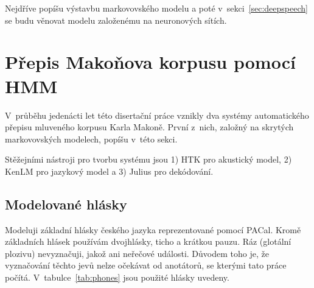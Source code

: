Nejdříve popíšu výstavbu markovovského modelu a poté
v~sekci~\ref{sec:deepspeech} se budu věnovat modelu založenému na neuronových
sítích.

\section{Přepis Makoňova korpusu pomocí HMM}

V~průběhu jedenácti let této disertační práce vznikly dva systémy automatického
přepisu mluveného korpusu Karla Makoně. První z~nich, založný na skrytých
markovovských modelech, popíšu v~této sekci.

Stěžejními nástroji pro tvorbu systému jsou 1) HTK pro akustický model, 2) KenLM
pro jazykový model a 3) Julius pro dekódování.

\subsection{Modelované hlásky}
\label{ssec:ac:fonetika}

Modeluji základní hlásky českého jazyka\cite{palkova1992fonetika}
reprezentované pomocí PACal\cite{nouza1997phonetic}. Kromě základních hlásek
používám dvojhlásky, ticho a krátkou pauzu. Ráz (glotální plozivu) nevyznačuji,
jakož ani neřečové události. Důvodem toho je, že vyznačování těchto jevů nelze
očekávat od anotátorů, se kterými tato práce počítá.
V~tabulce~\ref{tab:phones} jsou použité hlásky uvedeny.

